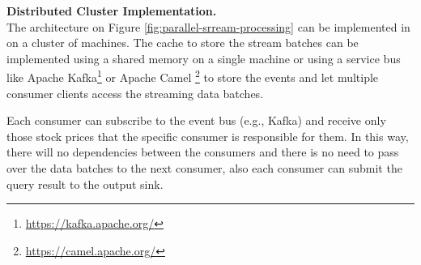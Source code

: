

        


    
\textbf{Distributed Cluster Implementation.}\\
The architecture on Figure \ref{fig:parallel-srream-processing} can be implemented in on a cluster of machines.
The cache to store the stream batches can be implemented using a shared memory on a single machine or using a service bus
like Apache Kafka\footnote{\url{https://kafka.apache.org/}} or Apache Camel \footnote{\url{https://camel.apache.org/}} to store 
the events and let multiple consumer clients access the streaming data batches.  

Each consumer can subscribe to the event bus (e.g., Kafka) and receive only those stock prices that the specific consumer is responsible 
for them. In this way, there will no dependencies between the consumers and there is no need to pass over the data batches to the next 
consumer, also each consumer can submit the query result to the output sink.  


